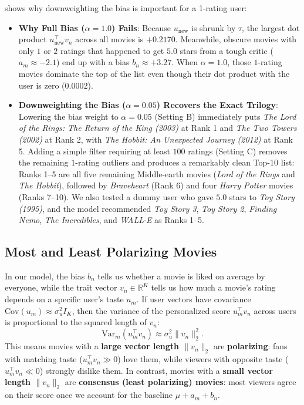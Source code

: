 \documentclass{article}
\theoremstyle{plain}
\theoremstyle{definition}
\begin{document}
 shows why downweighting the bias is important for a 1-rating user:
\begin{itemize}
    \item \textbf{Why Full Bias ($\alpha=1.0$) Fails}: Because $u_{\text{new}}$ is shrunk by $\tau$, the largest dot product $u_{\text{new}}^\top v_n$ across all movies is $+0.2170$. Meanwhile, obscure movies with only $1$ or $2$ ratings that happened to get $5.0$ stars from a tough critic ($a_m \approx -2.1$) end up with a bias $b_n \approx +3.27$. When $\alpha = 1.0$, those $1$-rating movies dominate the top of the list even though their dot product with the user is zero ($0.0002$).
    \item \textbf{Downweighting the Bias ($\alpha=0.05$) Recovers the Exact Trilogy}: Lowering the bias weight to $\alpha = 0.05$ (Setting B) immediately puts \emph{The Lord of the Rings: The Return of the King (2003)} at Rank 1 and \emph{The Two Towers (2002)} at Rank 2, with \emph{The Hobbit: An Unexpected Journey (2012)} at Rank 5. Adding a simple filter requiring at least $100$ ratings (Setting C) removes the remaining $1$-rating outliers and produces a remarkably clean Top-10 list: Ranks 1--5 are all five remaining Middle-earth movies (\emph{Lord of the Rings} and \emph{The Hobbit}), followed by \emph{Braveheart} (Rank 6) and four \emph{Harry Potter} movies (Ranks 7--10). We also tested a dummy user who gave $5.0$ stars to \emph{Toy Story (1995)}, and the model recommended \emph{Toy Story 3}, \emph{Toy Story 2}, \emph{Finding Nemo}, \emph{The Incredibles}, and \emph{WALL$\cdot$E} as Ranks 1--5.
\end{itemize}

\subsection{Most and Least Polarizing Movies}

In our model, the bias $b_n$ tells us whether a movie is liked on average by everyone, while the trait vector $v_n \in \mathbb{R}^K$ tells us how much a movie's rating depends on a specific user's taste $u_m$. If user vectors have covariance $\text{Cov}(u_m) \approx \sigma_u^2 I_K$, then the variance of the personalized score $u_m^\top v_n$ across users is proportional to the squared length of $v_n$:
\begin{equation}
\text{Var}_m(u_m^\top v_n) \approx \sigma_u^2 \|v_n\|_2^2.
\label{eq:polarization_variance}
\end{equation}
This means movies with a \textbf{large vector length $\|v_n\|_2$} are \textbf{polarizing}: fans with matching taste ($u_m^\top v_n \gg 0$) love them, while viewers with opposite taste ($u_m^\top v_n \ll 0$) strongly dislike them. In contrast, movies with a \textbf{small vector length $\|v_n\|_2$} are \textbf{consensus (least polarizing) movies}: most viewers agree on their score once we account for the baseline $\mu + a_m + b_n$.
\end{document}
